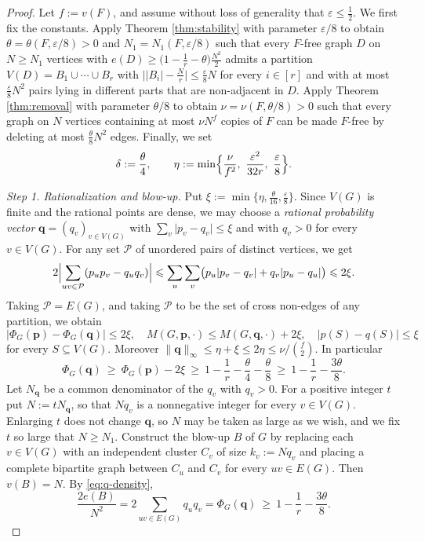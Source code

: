 \documentclass[10pt,a4paper]{amsart}
\renewcommand{\ge}{\geqslant}
\renewcommand{\le}{\leqslant}
\begin{document}
\begin{proof}
Let $f:=v(F)$, and assume without loss of generality
that $\varepsilon\le\frac12$. We first fix the
constants. 
Apply Theorem \ref{thm:stability} with parameter
$\varepsilon/8$ to obtain $\theta=\theta(F,\varepsilon/8)>0$
and $N_1=N_1(F,\varepsilon/8)$ such that every $F$-free
graph $D$ on $N\ge N_1$ vertices with
$e(D)\ge\bigl(1-\frac1r-\theta\bigr)\frac{N^2}{2}$
admits a partition $V(D)=B_1\cup\cdots\cup B_r$ with
$\bigl\lvert|B_i|-\frac Nr\bigr\rvert
\le\frac{\varepsilon}{8}N$ for every $i\in[r]$ and
with at most $\frac{\varepsilon}{8}N^2$ pairs lying
in different parts that are non-adjacent in $D$.
Apply Theorem \ref{thm:removal} with parameter
$\theta/8$ to obtain $\nu=\nu(F,\theta/8)>0$ such that
every graph on $N$ vertices containing at most
$\nu N^f$ copies of $F$ can be made $F$-free
by deleting at most $\frac{\theta}{8}N^2$ edges.
Finally, we set  
\[
  \delta:=\frac{\theta}{4},
  \qquad
  \eta:=\min\Bigl\{\frac{\nu}{f^2},\
  \frac{\varepsilon^2}{32r},\
  \frac{\varepsilon}{8}\Bigr\}.
\]



\noindent
\textit{Step 1. Rationalization and blow-up.}
Put $\xi:=\min\{\eta,\frac{\theta}{16},\frac{\varepsilon}{8}\}$. Since $V(G)$ is finite and the rational points are dense, 
we may choose a {\it rational probability vector} $\bm q=(q_v)_{v\in V(G)}$ with
$\sum_{v}\lvert p_v-q_v\rvert\le\xi$ and with $q_v>0$ for every $v\in V(G)$. 
For any set $\mathcal P$ of unordered pairs of distinct vertices, we get 
\[
  2\Bigl\lvert\sum_{uv\in\mathcal P}
  (p_up_v-q_uq_v)\Bigr\rvert
  \le\sum_{u}\sum_{v}
  \bigl(p_u\lvert p_v-q_v \rvert
  +q_v\lvert p_u-q_u \rvert\bigr)\le2\xi .
\]
Taking $\mathcal P=E(G)$, 
and taking $\mathcal P$ to be the set
of cross non-edges of any partition, we obtain 
\begin{equation}\label{eq:rat}
  \lvert\Phi_G(\bm p)-\Phi_G(\bm q)\rvert\le2\xi,
  \quad
  M(G,\bm p, \cdot)\le M(G,\bm q, \cdot)+2\xi,
  \quad
  \lvert p(S)-q(S)\rvert\le\xi
\end{equation}
for every $S\subseteq V(G)$. Moreover
$\lVert\bm q\rVert_\infty\le\eta+\xi\le2\eta
\le\nu/\binom f2$. In particular
\begin{equation}\label{eq:q-density}
  \Phi_G(\bm q)\ \ge\ \Phi_G(\bm p)-2\xi
  \ \ge\ 1-\frac1r-\frac{\theta}{4}
   -\frac{\theta}{8}
  \ \ge\ 1-\frac1r-\frac{3\theta}{8}.
\end{equation}
Let $N_{\bm q}$ be a common denominator of the $q_v$ with $q_v >0$. For a positive integer $t$ put
$N:=tN_{\bm q}$, so that $Nq_v$ is a nonnegative integer
for every $v\in V(G)$. Enlarging $t$ does not change
$\bm q$, so $N$ may be taken as large as we wish, and
we fix $t$ so large that $N\ge N_1$. Construct the
blow-up $B$ of $G$ by replacing each $v\in V(G)$ with an
independent cluster $C_v$ of size $k_v:=Nq_v$ and placing a complete bipartite graph between $C_u$ and
$C_v$ for every $uv\in E(G)$. 
Then $v(B)=N$.  By  \eqref{eq:q-density},
\begin{equation}\label{eq:blowup-density}
  \frac{2e(B)}{N^2}
  =2\sum_{uv\in E(G)}q_uq_v
  =\Phi_{G}(\bm q)
  \ \ge\ 1-\frac1r-\frac{3\theta}{8}.
\end{equation}


\end{proof}
\end{document}
